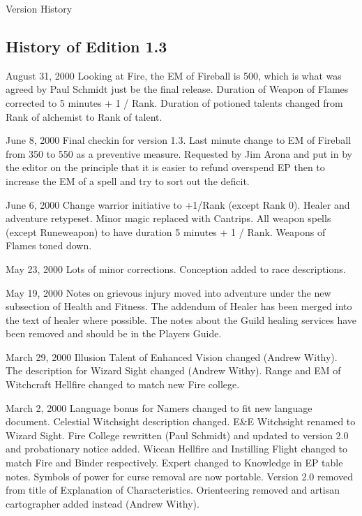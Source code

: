 \begin{Chapter}{Version History}
\begin{Description}
\end{Description}

\subsection{History of Edition 1.3}

\begin{Description}

\item[August 31, 2000] Looking at Fire, the EM of Fireball is 500,
  which is what was agreed by Paul Schmidt just be the final release.
  Duration of Weapon of Flames corrected to 5 minutes + 1 / Rank.
  Duration of potioned talents changed from Rank of alchemist to Rank
  of talent.

\item[June 8, 2000] Final checkin for version 1.3.  Last minute change
  to EM of Fireball from 350 to 550 as a preventive measure.
  Requested by Jim Arona and put in by the editor on the principle
  that it is easier to refund overspend EP then to increase the EM of
  a spell and try to sort out the deficit.

\item[June 6, 2000] Change warrior initiative to +1/Rank (except Rank
  0).  Healer and adventure retypeset.  Minor magic replaced with
  Cantrips.  All weapon spells (except Runeweapon) to have duration 5
  minutes + 1 / Rank.  Weapons of Flames toned down.

\item[May 23, 2000] Lots of minor corrections.  Conception added to
  race descriptions.

\item[May 19, 2000] Notes on grievous injury moved into adventure
  under the new subsection of Health and Fitness. The addendum of
  Healer has been merged into the text of healer where possible.  The
  notes about the Guild healing services have been removed and
  should be in the Players Guide.

\item[March 29, 2000] Illusion Talent of Enhanced Vision changed
  (Andrew Withy).  The description for Wizard Sight changed (Andrew
  Withy). Range and EM of Witchcraft Hellfire changed to match new
  Fire college.

\item[March 2, 2000] Language bonus for Namers changed to fit new
  language document.  Celestial Witchsight description changed.  E\&E
  Witchsight renamed to Wizard Sight.  Fire College rewritten (Paul
  Schmidt) and updated to version 2.0 and probationary notice added.
  Wiccan Hellfire and Instilling Flight changed to match Fire and
  Binder respectively.  Expert changed to Knowledge in EP table notes.
  Symbols of power for curse removal are now portable.  Version 2.0
  removed from title of Explanation of Characteristics.  Orienteering
  removed and artisan cartographer added instead (Andrew Withy).


\end{Description}
\end{Chapter}
